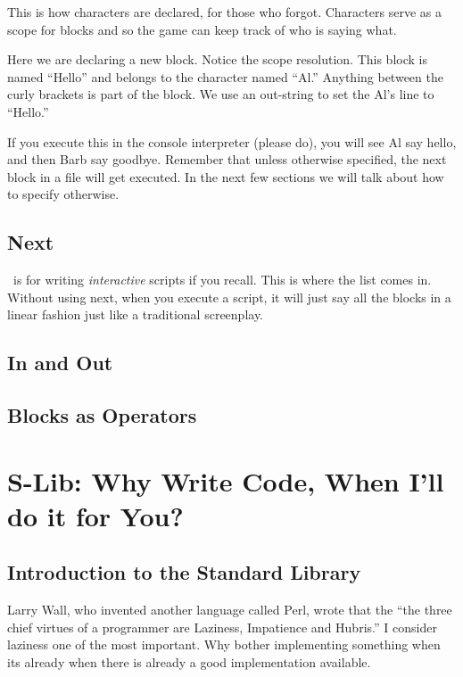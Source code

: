 \documentclass{book}
\begin{document}
This is how characters are declared, for those who forgot.  Characters serve as a scope for blocks and so the game can keep track of who is saying what.

Here we are declaring a new block.  Notice the scope resolution.  This block is named ``Hello'' and belongs to the character named ``Al.''  Anything between the curly brackets is part of the block.  We use an out-string to set the Al's line to ``Hello.''

If you execute this in the console interpreter (please do), you will see Al say hello, and then Barb say goodbye.  Remember that unless otherwise specified, the next block in a file will get executed.  In the next few sections we will talk about how to specify otherwise.

\section{Next}

\SSquared\ is for writing \emph{interactive} scripts if you recall.  This is where the  list comes in.  Without using next, when you execute a script, it will just say all the blocks in a linear fashion just like a traditional screenplay.  


\section{In and Out}




\section{Blocks as Operators}



\chapter{S-Lib: Why Write Code, When I'll do it for You?}
\section{Introduction to the Standard Library}
Larry Wall, who invented another language called Perl, wrote that the ``the three chief virtues of a programmer are Laziness, Impatience and Hubris.''  I consider laziness one of the most important.  Why bother implementing something when its already when there is already a good implementation available.
\end{document}
